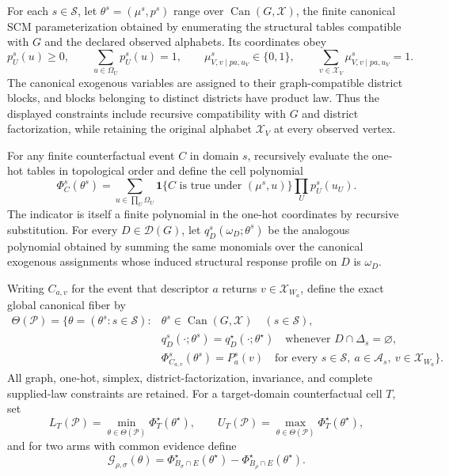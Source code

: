 For each \(s\in\mathcal S\), let \(\theta^s=(\mu^s,p^s)\) range over \(\operatorname{Can}(G,\mathcal X)\), the finite canonical SCM parameterization obtained by enumerating the structural tables compatible with \(G\) and the declared observed alphabets.  Its coordinates obey
\[
 p_{U}^{s}(u)\geq 0,\qquad \sum_{u\in\Omega_U}p_U^s(u)=1,
 \qquad
 \mu_{V,v\mid pa,u_V}^{s}\in\{0,1\},\qquad
 \sum_{v\in\mathcal X_V}\mu_{V,v\mid pa,u_V}^{s}=1.
\]
The canonical exogenous variables are assigned to their graph-compatible district blocks, and blocks belonging to distinct districts have product law.  Thus the displayed constraints include recursive compatibility with \(G\) and district factorization, while retaining the original alphabet \(\mathcal X_V\) at every observed vertex.

For any finite counterfactual event \(C\) in domain \(s\), recursively evaluate the one-hot tables in topological order and define the cell polynomial
\[
 \Phi_C^s(\theta^s)
 =\sum_{u\in\prod_U\Omega_U}
   \mathbf 1\{C\text{ is true under }(\mu^s,u)\}
   \prod_U p_U^s(u_U).
\]
The indicator is itself a finite polynomial in the one-hot coordinates by recursive substitution.  For every \(D\in\mathcal D(G)\), let \(q_D^s(\omega_D;\theta^s)\) be the analogous polynomial obtained by summing the same monomials over the canonical exogenous assignments whose induced structural response profile on \(D\) is \(\omega_D\).

Writing \(C_{a,v}\) for the event that descriptor \(a\) returns \(v\in\mathcal X_{W_a}\), define the exact global canonical fiber by
\[
\begin{split}
 \Theta(\mathcal P)=\bigl\{\theta=(\theta^s:s\in\mathcal S):{}&
 \theta^s\in\operatorname{Can}(G,\mathcal X)\quad(s\in\mathcal S),\\
 &q_D^s(\cdot;\theta^s)=q_D^\star(\cdot;\theta^\star)
   \quad\text{whenever }D\cap\Delta_s=\varnothing,\\
 &\Phi_{C_{a,v}}^s(\theta^s)=P_a^s(v)
   \quad\text{for every }s\in\mathcal S,\ a\in\mathcal A_s,
   \ v\in\mathcal X_{W_a}\bigr\}.
\end{split}
\]
All graph, one-hot, simplex, district-factorization, invariance, and complete supplied-law constraints are retained.  For a target-domain counterfactual cell \(T\), set
\[
 L_T(\mathcal P)=\min_{\theta\in\Theta(\mathcal P)}\Phi_T^\star(\theta^\star),
 \qquad
 U_T(\mathcal P)=\max_{\theta\in\Theta(\mathcal P)}\Phi_T^\star(\theta^\star),
\]
and for two arms with common evidence define
\[
 \mathcal G_{\rho,\sigma}(\theta)
 =\Phi_{B_\sigma\cap E}^\star(\theta^\star)
  -\Phi_{B_\rho\cap E}^\star(\theta^\star).
\]